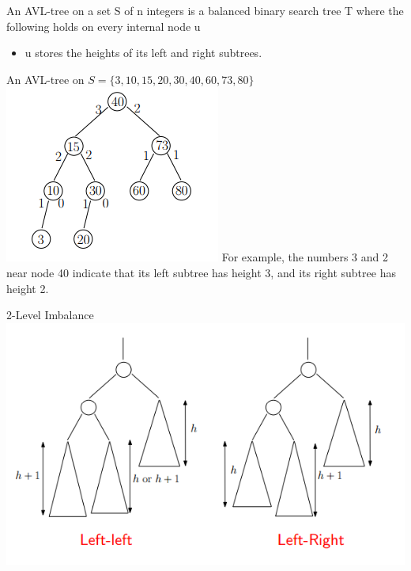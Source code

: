 \documentclass{lecture}
\begin{document}
\begin{landscape}
\begin{multicols}{2}
    \begin{note}{}
        An AVL-tree on a set S of n integers is a balanced binary search tree T where the following holds on every internal node u
        \begin{itemize}
            \item u stores the heights of its left and right subtrees.
        \end{itemize}
        An AVL-tree on $S=\{3,10,15,20,30,40,60,73,80\}$\\
        \includegraphics[width=\linewidth]{avl}
        For example, the numbers 3 and 2 near node 40 indicate that its left subtree has height 3, and its right subtree has height 2.
    \end{note}
    \vfill
    \begin{note}{2-Level Imbalance}
        \includegraphics[width=\linewidth]{2level}

\end{note}
\end{multicols}
\end{landscape}
\end{document}
